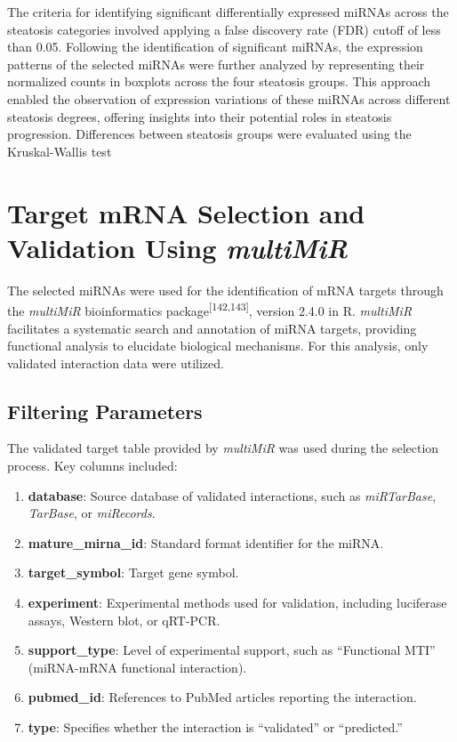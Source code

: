 \documentclass[
  11pt,
  letterpaper,
]{book}
\providecommand{\tightlist}{%
  \setlength{\itemsep}{0pt}\setlength{\parskip}{0pt}}\usepackage{longtable,booktabs,array}
\begin{document}
The criteria for identifying significant differentially expressed miRNAs
across the steatosis categories involved applying a false discovery rate
(FDR) cutoff of less than 0.05. Following the identification of
significant miRNAs, the expression patterns of the selected miRNAs were
further analyzed by representing their normalized counts in boxplots
across the four steatosis groups. This approach enabled the observation
of expression variations of these miRNAs across different steatosis
degrees, offering insights into their potential roles in steatosis
progression. Differences between steatosis groups were evaluated using
the Kruskal-Wallis test

\section{\texorpdfstring{Target mRNA Selection and Validation Using
\emph{multiMiR}}{Target mRNA Selection and Validation Using multiMiR}}\label{target-mrna-selection-and-validation-using-multimir}

The selected miRNAs were used for the identification of mRNA targets
through the \emph{multiMiR} bioinformatics
package\textsuperscript{{[}142,143{]}}, version 2.4.0 in R.
\emph{multiMiR} facilitates a systematic search and annotation of miRNA
targets, providing functional analysis to elucidate biological
mechanisms. For this analysis, only validated interaction data were
utilized.

\subsection{Filtering Parameters}\label{filtering-parameters}

The validated target table provided by \emph{multiMiR} was used during
the selection process. Key columns included:

\begin{enumerate}
\def\labelenumi{\arabic{enumi}.}
\tightlist
\item
  \textbf{database}: Source database of validated interactions, such as
  \emph{miRTarBase}, \emph{TarBase}, or \emph{miRecords}.
\item
  \textbf{mature\_mirna\_id}: Standard format identifier for the miRNA.
\item
  \textbf{target\_symbol}: Target gene symbol.
\item
  \textbf{experiment}: Experimental methods used for validation,
  including luciferase assays, Western blot, or qRT-PCR.
\item
  \textbf{support\_type}: Level of experimental support, such as
  ``Functional MTI'' (miRNA-mRNA functional interaction).
\item
  \textbf{pubmed\_id}: References to PubMed articles reporting the
  interaction.
\item
  \textbf{type}: Specifies whether the interaction is ``validated'' or
  ``predicted.''
\end{enumerate}
\end{document}
